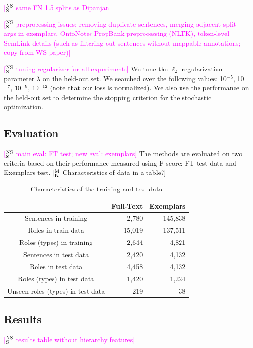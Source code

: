\documentclass[11pt,a4paper]{article}
\newcommand{\ensuretext}[1]{#1}
\newcommand{\nssmarker}{\ensuretext{\textcolor{magenta}{\ensuremath{^{\textsc{NS}}_{\textsc{S}}}}}}
\newcommand{\mkmarker}{\ensuretext{\textcolor{mdgreen}{\ensuremath{^{\textsc{M}}_{\textsc{K}}}}}}
\newcommand{\arkcomment}[3]{\ensuretext{\textcolor{#3}{[#1 #2]}}}
\newcommand{\nss}[1]{\arkcomment{\nssmarker}{#1}{magenta}}
\newcommand{\mk}[1]{\arkcomment{\mkmarker}{#1}{mdgreen}}
\begin{document}
\nss{same FN 1.5 splits as Dipanjan}


\nss{preprocessing issues: removing duplicate sentences, merging adjacent split args in exemplars, OntoNotes PropBank preprocessing (NLTK), token-level SemLink details (such as filtering out sentences without mappable annotations; copy from WS paper)}

\nss{tuning regularizer for all experiments}
We tune the $\ell_2$ regularization parameter $\lambda$ on the held-out set. We searched over the following
values: 10$^{-5}$, 10$^{-7}$, 10$^{-9}$, 10$^{-12}$ (note that our loss is normalized).
We also use the performance on the held-out set to determine the stopping criterion for the stochastic optimization.




\subsection{Evaluation}

\nss{main eval: FT test; new eval: exemplars}
The methods are evaluated on two criteria based on their performance measured using F-score: FT test data and Exemplars test.
\mk{Characteristics of data in a table?}

\begin{table}\centering\small
\begin{tabular}{crr}
\toprule
\normalfont & \textbf{Full-Text} & \textbf{Exemplars} \\
\midrule
Sentences in training & 2,780 & 145,838 \\
Roles in train data & 15,019 & 137,511 \\
Roles (types) in training & 2,644 & 4,821 \\
Sentences in test data & 2,420 & 4,132 \\
Roles in test data & 4,458 & 4,132 \\
Roles (types) in test data & 1,420 & 1,224 \\
Unseen roles (types) in test data & 219 & 38 \\
\end{tabular}
\caption{Characteristics of the training and test data}
\end{table}


\subsection{Results}

\nss{results table without hierarchy features}
\end{document}
